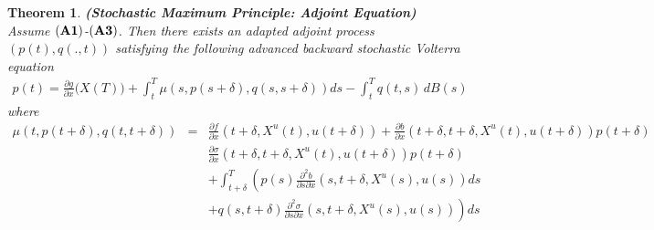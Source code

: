 \documentclass[12pt]{article}
\newtheorem{theorem}{Theorem}[section]
\theoremstyle{remark}
\numberwithin{equation}{section}
\begin{document}
\begin{theorem}{\textbf{(Stochastic Maximum Principle: Adjoint Equation)}}\label{1}\\
Assume $({\bf A1})$-$({\bf A3})$. Then there exists an adapted adjoint process $(p(t), q(.,t))$ satisfying the following advanced backward stochastic Volterra equation  
\begin{eqnarray}\label{p}
p(t) = \frac{\partial g}{\partial x}\big(X(T)\big)+\int_t^T\mu(s,p(s+\delta),q(s,s+\delta))ds- \int_t^T q(t,s)\, dB(s)
\end{eqnarray}
where  
\begin{eqnarray*}
\mu(t,p(t+\delta),q(t,t+\delta))&=&\frac{\partial f}{\partial x}(t+\delta,X^{u}(t),u(t+\delta)) + \frac{\partial b}{\partial x}(t+\delta,t+\delta,X^{u}(t),u(t+\delta))p(t+\delta)\\
&&\frac{\partial \sigma}{\partial x}(t+\delta,t+\delta,X^{u}(t),u(t+\delta))p(t+\delta)\\
&&+\int_{t+\delta}^{T}\left(p(s) \frac{\partial^2 b}{\partial s \partial x}(s,t+\delta,X^{u}(s),u(s))ds\right.\\
&&\left.+q(s,t+\delta) \frac{\partial^2 \sigma}{\partial s \partial x}(s,t+\delta,X^{u}(s),u(s))\right)ds
\end{eqnarray*}
\end{theorem}
\end{document}

